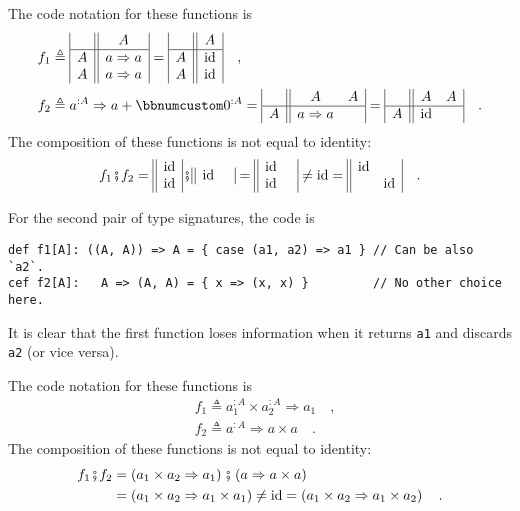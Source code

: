 The code notation for these functions is
\begin{align*}
 & f_{1}\triangleq\begin{array}{|c||c|}
 & A\\
\hline A & a\Rightarrow a\\
A & a\Rightarrow a
\end{array}=\begin{array}{|c||c|}
 & A\\
\hline A & \text{id}\\
A & \text{id}
\end{array}\quad,\\
 & f_{2}\triangleq a^{:A}\Rightarrow a+\bbnum 0^{:A}=\begin{array}{|c||cc|}
 & A & A\\
\hline A & a\Rightarrow a & 
\end{array}=\begin{array}{|c||cc|}
 & A & A\\
\hline A & \text{id} & 
\end{array}\quad.
\end{align*}
The composition of these functions is not equal to identity:
\[
f_{1}\bef f_{2}=\begin{array}{||c|}
\text{id}\\
\text{id}
\end{array}\bef\begin{array}{||cc|}
\text{id} & \end{array}=\begin{array}{||cc|}
\text{id} & \\
\text{id} & 
\end{array}\neq\text{id}=\begin{array}{||cc|}
\text{id} & \\
 & \text{id}
\end{array}\quad.
\]

For the second pair of type signatures, the code is
\begin{lstlisting}
def f1[A]: ((A, A)) => A = { case (a1, a2) => a1 } // Can be also `a2`.
cef f2[A]:   A => (A, A) = { x => (x, x) }         // No other choice here.
\end{lstlisting}
It is clear that the first function loses information when it returns
\lstinline!a1! and discards \lstinline!a2! (or vice versa).

The code notation for these functions is
\begin{align*}
 & f_{1}\triangleq a_{1}^{:A}\times a_{2}^{:A}\Rightarrow a_{1}\quad,\\
 & f_{2}\triangleq a^{:A}\Rightarrow a\times a\quad.
\end{align*}
The composition of these functions is not equal to identity:
\begin{align*}
f_{1}\bef f_{2} & =\left(a_{1}\times a_{2}\Rightarrow a_{1}\right)\bef\left(a\Rightarrow a\times a\right)\\
 & =\left(a_{1}\times a_{2}\Rightarrow a_{1}\times a_{1}\right)\neq\text{id}=\left(a_{1}\times a_{2}\Rightarrow a_{1}\times a_{2}\right)\quad.
\end{align*}

